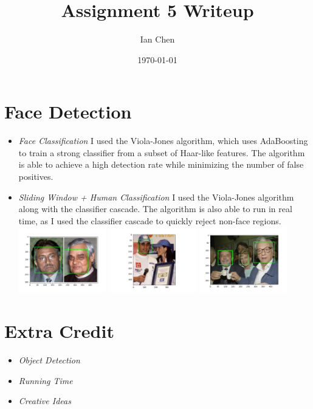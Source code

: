 \documentclass[11pt]{article}
\title{Assignment 5 Writeup}
\author{Ian Chen}
\date{\today}
\begin{document}
    \maketitle

    \section{Face Detection}
    
    \begin{itemize}
    \item \textit{Face Classification}\newline
    I used the Viola-Jones algorithm, which uses AdaBoosting to train a strong classifier from a
    subset of Haar-like features. The algorithm is able to achieve a high detection rate while
    minimizing the number of false positives.

    \item \textit{Sliding Window + Human Classification}\newline
    I used the Viola-Jones algorithm along with the classifier cascade. The algorithm is also
    able to run in real time, as I used the classifier cascade to quickly reject non-face regions.\newline
    \includegraphics[width=0.3\textwidth]{Output Pictures/ex_1}
    \includegraphics[width=0.3\textwidth]{Output Pictures/ex_2}
    \includegraphics[width=0.3\textwidth]{Output Pictures/ex_3}


    \end{itemize}

    \section{Extra Credit}

    \begin{itemize}
    \item \textit{Object Detection}

    \item \textit{Running Time}

    \item \textit{Creative Ideas}

    \end{itemize}
\end{document}
